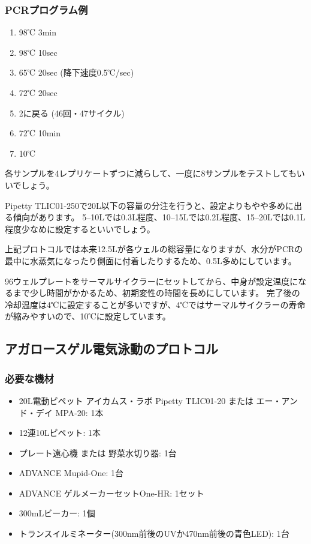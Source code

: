 \documentclass[titlepage,10pt,a4paper,uplatex]{jsbook}
\begin{document}
\subsubsection{PCRプログラム例}
\begin{enumerate}
\item 98℃ 3min
\item 98℃ 10sec
\item 65℃ 20sec (降下速度0.5℃/sec)
\item 72℃ 20sec
\item 2に戻る (46回・47サイクル)
\item 72℃ 10min
\item 10℃
\end{enumerate}

各サンプルを4レプリケートずつに減らして、一度に8サンプルをテストしてもいいでしょう。

Pipetty TLIC01-250で20{\textmu}L以下の容量の分注を行うと、設定よりもやや多めに出る傾向があります。
5--10{\textmu}Lでは0.3{\textmu}L程度、10--15{\textmu}Lでは0.2{\textmu}L程度、15--20{\textmu}Lでは0.1{\textmu}L程度少なめに設定するといいでしょう。

上記プロトコルでは本来12.5{\textmu}Lが各ウェルの総容量になりますが、水分がPCRの最中に水蒸気になったり側面に付着したりするため、0.5{\textmu}L多めにしています。

96ウェルプレートをサーマルサイクラーにセットしてから、中身が設定温度になるまで少し時間がかかるため、初期変性の時間を長めにしています。
完了後の冷却温度は4℃に設定することが多いですが、4℃ではサーマルサイクラーの寿命が縮みやすいので、10℃に設定しています。

\subsection{アガロースゲル電気泳動のプロトコル}

\subsubsection{必要な機材}
\begin{itemize}
\item 20{\textmu}L電動ピペット アイカムス・ラボ Pipetty TLIC01-20 または エー・アンド・デイ MPA-20: 1本
\item 12連10{\textmu}Lピペット: 1本
\item プレート遠心機 または 野菜水切り器: 1台
\item ADVANCE Mupid-One: 1台
\item ADVANCE ゲルメーカーセットOne-HR: 1セット
\item 300mLビーカー: 1個
\item トランスイルミネーター(300nm前後のUVか470nm前後の青色LED): 1台
\end{itemize}
\end{document}
